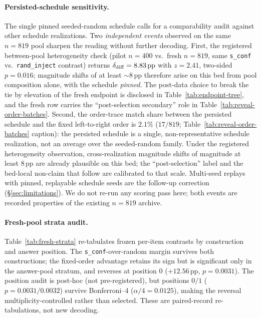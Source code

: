 \documentclass{article}
\newcommand{\sconf}{\texttt{s\_conf}}
\newcommand{\rinj}{\texttt{rand\_inject}}
\newcommand{\pp}{\,\mathrm{pp}}
\begin{document}
\paragraph{Persisted-schedule sensitivity.}  The single pinned seeded-random
schedule calls for a comparability audit against other schedule realizations.
Two \emph{independent events} observed on the same $n{=}819$ pool sharpen the
reading without further decoding.  First, the registered between-pool
heterogeneity check (pilot $n{=}400$ vs.\ fresh $n{=}819$, same \sconf{}
vs.\ \rinj{} contrast) returns $\delta_{\rm diff}=8.83\pp$ with $z=2.41$,
two-sided $p=0.016$; magnitude shifts of at least $\sim8\pp$ therefore arise
on this bed from pool composition alone, with the schedule \emph{pinned}.  The
post-data choice to break the tie by elevation of the fresh endpoint is
disclosed in Table~\ref{tab:endpoint-tree}, and the fresh row carries the
``post-selection secondary'' role in
Table~\ref{tab:reveal-order-batches}.  Second, the order-trace match share
between the persisted schedule and the fixed left-to-right order is
$2.1\%$ ($17/819$; Table~\ref{tab:reveal-order-batches} caption): the
persisted schedule is a single, non-representative schedule realization, not
an average over the seeded-random family.  Under the registered heterogeneity
observation, cross-realization magnitude shifts of magnitude at least
$8\pp$ are already plausible on this bed; the ``post-selection'' label and
the bed-local non-claim that follow are calibrated to that scale.  Multi-seed
replays with pinned, replayable schedule seeds are the follow-up correction
(\S\ref{sec:limitations}).  We do not re-run any scoring pass here; both
events are recorded properties of the existing $n{=}819$ archive.

\paragraph{Fresh-pool strata audit.}
Table~\ref{tab:fresh-strata} re-tabulates frozen per-item contrasts by
construction and answer position.  The \sconf{}-over-random margin survives
both constructions; the fixed-order advantage retains its sign but is
significant only in the answer-pool stratum, and reverses at position $0$
($+12.56\pp$, $p{=}0.0031$).  The position audit is post-hoc (not
pre-registered), but positions $0/1$ ($p{=}0.0031/0.0032$) survive
Bonferroni--4 ($\alpha/4{=}0.0125$), making the reversal
multiplicity-controlled rather than selected.  These are paired-record
re-tabulations, not new decoding.
\end{document}
